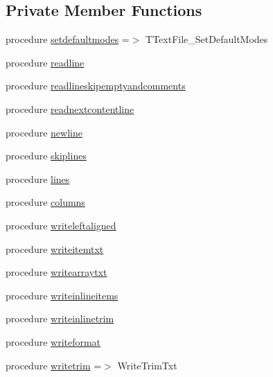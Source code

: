 \subsection*{Private Member Functions}
\begin{DoxyCompactItemize}
\item 
procedure \mbox{\hyperlink{structfileutils_1_1ttextfile_adbecb3b042a526a7199d877cb168021e}{setdefaultmodes}} =$>$ T\+Text\+File\+\_\+\+Set\+Default\+Modes
\item 
procedure \mbox{\hyperlink{structfileutils_1_1ttextfile_a47cc878d26f9638b30c92fbc03fa9c55}{readline}}
\item 
procedure \mbox{\hyperlink{structfileutils_1_1ttextfile_a93142936f55ca9b82dd952764dbea799}{readlineskipemptyandcomments}}
\item 
procedure \mbox{\hyperlink{structfileutils_1_1ttextfile_a40da86fd8e9cc0fd55ad88e683d2cd7f}{readnextcontentline}}
\item 
procedure \mbox{\hyperlink{structfileutils_1_1ttextfile_aa235e488b6a5472d0d60bb81f19abdf5}{newline}}
\item 
procedure \mbox{\hyperlink{structfileutils_1_1ttextfile_a6ef986cf20336adc6b276e332bb9a389}{skiplines}}
\item 
procedure \mbox{\hyperlink{structfileutils_1_1ttextfile_a79dacb7dd0a0ab103fe889ae2e132594}{lines}}
\item 
procedure \mbox{\hyperlink{structfileutils_1_1ttextfile_ad32f2adc580681fe5e19e8dee23293fa}{columns}}
\item 
procedure \mbox{\hyperlink{structfileutils_1_1ttextfile_a67c365e62168849c3be5b9331292bd7b}{writeleftaligned}}
\item 
procedure \mbox{\hyperlink{structfileutils_1_1ttextfile_a254af563ac2739594f8d6901900a9b28}{writeitemtxt}}
\item 
procedure \mbox{\hyperlink{structfileutils_1_1ttextfile_a78faee5eaf99175848d81962f2093153}{writearraytxt}}
\item 
procedure \mbox{\hyperlink{structfileutils_1_1ttextfile_ab554f0ffe963b9b56944b858a4d706fc}{writeinlineitems}}
\item 
procedure \mbox{\hyperlink{structfileutils_1_1ttextfile_a03e66e23045269c609cfa40d545ff6d6}{writeinlinetrim}}
\item 
procedure \mbox{\hyperlink{structfileutils_1_1ttextfile_a98c8b46b8c47fb8dc9f80ca32e6ab9e6}{writeformat}}
\item 
procedure \mbox{\hyperlink{structfileutils_1_1ttextfile_ae0cf2bdb6409cc13d38357fd078b2a90}{writetrim}} =$>$ Write\+Trim\+Txt

\end{DoxyCompactItemize}
